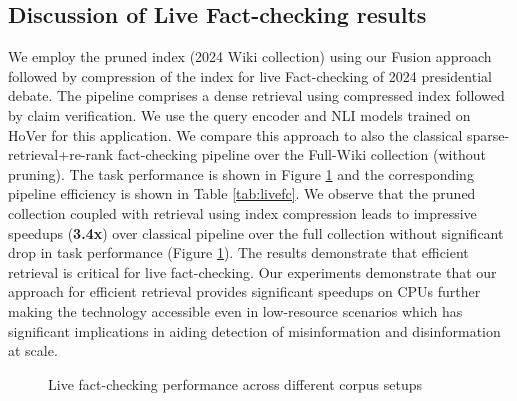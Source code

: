 \subsection{Discussion of Live Fact-checking results}
We employ the pruned index (2024 Wiki collection) using our Fusion approach followed by compression of the index for live Fact-checking of 2024 presidential debate. The pipeline comprises a dense retrieval using compressed index followed by claim verification. We use the query encoder and NLI models trained on HoVer for this application. We compare this approach to also the classical sparse-retrieval+re-rank fact-checking pipeline over the Full-Wiki collection (without pruning). The task performance is shown in Figure \ref{fig:livefc} and the corresponding pipeline efficiency is shown in Table \ref{tab:livefc}. We observe that the pruned collection coupled with retrieval using index compression leads to impressive speedups (\textbf{3.4x}) over classical pipeline over the full collection without significant drop in task performance (Figure \ref{fig:livefc}). The results demonstrate that efficient retrieval is critical for live fact-checking. Our experiments demonstrate that our approach for efficient retrieval provides significant speedups on CPUs further making the technology accessible even in low-resource scenarios which has significant implications in aiding detection of misinformation and disinformation at scale.
\begin{figure}
\centering
 \hspace{6em}     \begin{subfigure}{.8\textwidth}
        

    \end{subfigure}
    \caption{Live fact-checking performance across different corpus setups}
    \label{fig:livefc}
\end{figure}
\vspace{-2em}


